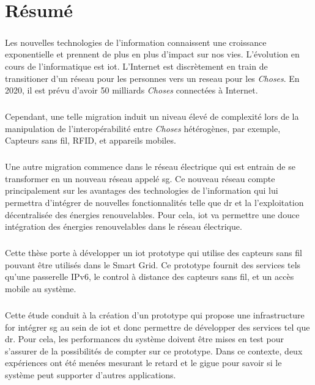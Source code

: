 \documentclass[oneside,12pt,a4paper,final]{book}
\begin{document}
\chapter*{Résumé}
\paragraph{}
Les nouvelles technologies de l'information connaissent une croissance exponentielle et prennent de plus en plus d'impact sur nos vies. L'évolution en cours de l'informatique est \gls{iot}. L'Internet est discrètement en train de transitioner d'un réseau pour les personnes vers un reseau pour les \textit{Choses}. En 2020, il est prévu d'avoir 50 milliards \textit{Choses} connectées à Internet.
\paragraph{}
Cependant, une telle migration induit un niveau élevé de complexité lors de la manipulation de l'interopérabilité entre \textit{Choses} hétérogènes, par exemple, Capteurs sans fil, RFID, et appareils mobiles.
\paragraph{}
Une autre migration commence dans le réseau électrique qui est entrain de se transformer en un nouveau réseau appelé \gls{sg}. Ce nouveau réseau compte principalement sur les avantages des technologies de l'information qui lui permettra d'intégrer de nouvelles fonctionnalités telle que \gls{dr} et la l'exploitation décentralisée des énergies renouvelables. Pour cela, \gls{iot} va permettre une douce intégration des énergies renouvelables dans le réseau électrique.
\paragraph{} 
Cette thèse porte à développer un \gls{iot} prototype qui utilise des capteurs sans fil pouvant être utilisés dans le Smart Grid. Ce prototype fournit des services tels qu'une passerelle IPv6, le control à distance des capteurs sans fil, et un accès mobile au système.
\paragraph{}
Cette étude conduit à la création d'un prototype qui propose une infrastructure for intégrer \gls{sg} au sein de \gls{iot} et donc permettre de développer des services tel que \gls{dr}. Pour cela, les performances du système doivent être mises en test pour s'assurer de la possibilités de compter sur ce prototype. Dans ce contexte, deux expériences ont été menées mesurant le retard et le gigue pour savoir si le système peut supporter d'autres applications.
\end{document}
